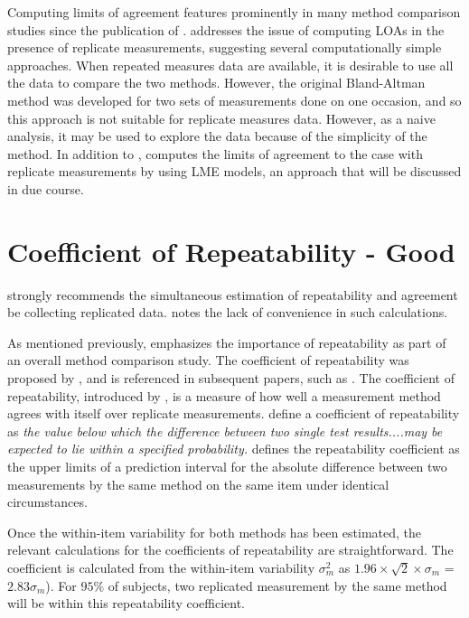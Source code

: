 \documentclass[12pt, a4paper]{report}
\theoremstyle{plain}
\theoremstyle{definition}
\theoremstyle{remark}
\begin{document}
Computing limits of agreement features prominently in many method comparison studies since the publication of \citet{BA86}.
\citet{BA99} addresses the issue of computing LOAs in the presence of replicate measurements, suggesting several computationally simple approaches. When repeated measures data are available, it is desirable to use
all the data to compare the two methods. However, the original Bland-Altman method was developed for two sets of measurements done on one occasion, and so this approach is not suitable for replicate measures data. However, as a naive analysis, it may be used to explore the data because of the simplicity of the method.
In addition to \citet{BA99}, \citet{BXC2008} computes the limits of agreement to the case with replicate measurements by using LME models, an approach that will be discussed in due course.




\section{Coefficient of Repeatability - Good}


\citet{BA99} strongly recommends the simultaneous estimation of repeatability and agreement be collecting replicated data. \citet{ARoy2009} notes the lack of convenience in such calculations.

	
	
	
As mentioned previously, \citet{Barnhart} emphasizes the importance of repeatability as part of an overall method comparison study. The coefficient of repeatability was proposed by \citet{BA99}, and is referenced in subsequent papers, such as \citet{BXC2008}. The coefficient of repeatability, introduced by \citet{BA99}, is a measure of how well a
measurement method agrees with itself over replicate measurements. \citet{BSIrepeat} define a coefficient of
repeatability  as \emph{the value below which the difference between two single test results....may be expected to lie within a specified probability.} \citet{BA99} defines the repeatability coefficient as the upper limits of a prediction interval for the absolute difference between two measurements by the same method on the same item under identical circumstances. %

 Once the within-item variability for both methods has been estimated, the relevant calculations for the coefficients of repeatability are straightforward.
The coefficient is calculated from the within-item variability $\sigma^2_{m}$ as  $1.96 \times \sqrt{2} \times \sigma_m$ = $2.83 \sigma_m$). For $95\%$ of subjects, two replicated measurement by the same method will be within this repeatability coefficient.
	
\end{document}
